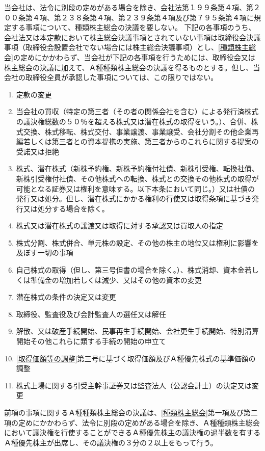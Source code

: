 \documentclass[10pt,a4paper,uplatex]{jsarticle}
\begin{document}
\term 当会社は、法令に別段の定めがある場合を除き、会社法第１９９条第４項、第２００条第４項、第２３８条第４項、第２３９条第４項及び第７９５条第４項に規定する事項について、種類株主総会の決議を要しない。
下記の各事項のうち、会社法又は本定款において株主総会決議事項とされていない事項は取締役会決議事項（取締役会設置会社でない場合には株主総会決議事項）とし、\ref{種類株主総会}の定めにかかわらず、当会社が下記の各事項を行うためには、取締役会又は株主総会の決議に加えて、Ａ種種類株主総会の決議を得るものとする。但し、当会社の取締役全員が承認した事項については、この限りではない。
\begin{enumerate}
\item 定款の変更
\item 当会社の買収（特定の第三者（その者の関係会社を含む）による発行済株式の議決権総数の５０％を超える株式又は潜在株式の取得をいう。）、合併、株式交換、株式移転、株式交付、事業譲渡、事業譲受、会社分割その他企業再編若しくは第三者との資本提携の実施、第三者からのこれらに関する提案の受諾又は拒絶
\item 株式、潜在株式（新株予約権、新株予約権付社債、新株引受権、転換社債、新株引受権付社債、その他株式への転換、株式との交換その他株式の取得が可能となる証券又は権利を意味する。以下本条において同じ。）又は社債の発行又は処分。但し、潜在株式にかかる権利の行使又は取得条項に基づき発行又は処分する場合を除く。
\item 株式又は潜在株式の譲渡又は取得に対する承認又は買取人の指定
\item 株式分割、株式併合、単元株の設定、その他の株主の地位又は権利に影響を及ぼす一切の事項
\item 自己株式の取得（但し、第三号但書の場合を除く。）、株式消却、資本金若しくは準備金の増加若しくは減少、又はその他の資本の変更
\item 潜在株式の条件の決定又は変更
\item 取締役、監査役及び会計監査人の選任又は解任
\item 解散、又は破産手続開始、民事再生手続開始、会社更生手続開始、特別清算開始その他これらに類する手続の開始の申立て
\item \ref{取得価額等の調整}第三号に基づく取得価額及びＡ種優先株式の基準価額の調整
\item 株式上場に関する引受主幹事証券又は監査法人（公認会計士）の決定又は変更
\end{enumerate}
\term 前項の事項に関するＡ種種類株主総会の決議は、\ref{種類株主総会}第一項及び第二項の定めにかかわらず、法令に別段の定めがある場合を除き、Ａ種種類株主総会において議決権を行使することができるＡ種優先株主の議決権の過半数を有するＡ種優先株主が出席し、その議決権の３分の２以上をもって行う。
\end{document}
